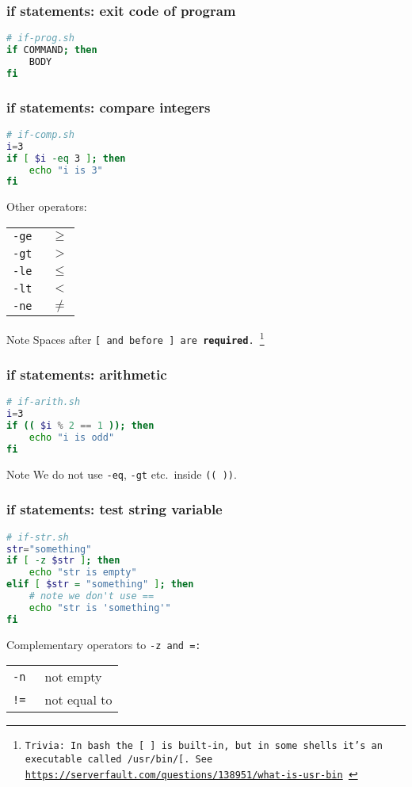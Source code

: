 \begin{frame}[fragile]
\frametitle{\textbf{if} statements: exit code of program}
\begin{lstlisting}[language=bash]
# if-prog.sh
if COMMAND; then
    BODY
fi
\end{lstlisting}
\end{frame}

\begin{frame}[fragile]
\frametitle{\textbf{if} statements: compare integers}
\begin{lstlisting}[language=bash]
# if-comp.sh
i=3
if [ $i -eq 3 ]; then
    echo "i is 3"
fi
\end{lstlisting}
Other operators:
\begin{table}
    \centering
    \begin{tabular}{ll}
        \tt{-ge} & $\geq$ \\
        \tt{-gt} & $>$    \\
        \tt{-le} & $\leq$ \\
        \tt{-lt} & $<$    \\
        \tt{-ne} & $\neq$
    \end{tabular}
\end{table}
\begin{block}{Note}
    Spaces after \tt{[} and before \tt{]} are \textbf{required}.
    \footnote{
        Trivia: In bash the \tt{[ ]} is built-in, but in some shells
        it's an executable called \tt{/usr/bin/[}.
        See \url{https://serverfault.com/questions/138951/what-is-usr-bin}
    }
\end{block}
\end{frame}

\begin{frame}[fragile]
\frametitle{\textbf{if} statements: arithmetic}
\begin{lstlisting}[language=bash]
# if-arith.sh
i=3
if (( $i % 2 == 1 )); then
    echo "i is odd"
fi
\end{lstlisting}
\begin{block}{Note}
    We do not use \verb|-eq|, \verb|-gt| etc.~inside \verb|(( ))|.
\end{block}
\end{frame}

\begin{frame}[fragile]
\frametitle{\textbf{if} statements: test string variable}
\begin{lstlisting}[language=bash]
# if-str.sh
str="something"
if [ -z $str ]; then
    echo "str is empty"
elif [ $str = "something" ]; then
    # note we don't use ==
    echo "str is 'something'"
fi
\end{lstlisting}
Complementary operators to \tt{-z} and \tt{=}:
\begin{table}
    \centering
    \begin{tabular}{ll}
        \tt{-n} & not empty \\
        \tt{!=} & not equal to
    \end{tabular}
\end{table}
\end{frame}

